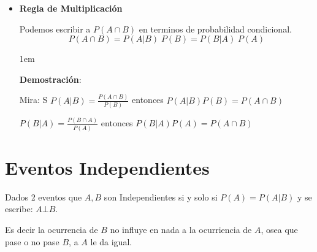 \documentclass[12pt, fleqn]{report}                             %
\newenvironment{SmallIndentation}[1][0.75em]                    %
        {\begin{adjustwidth}{#1}{}\begin{footnotesize}}             %
        {\end{footnotesize}\end{adjustwidth}}                       %
\theoremstyle{break}                                            %
\begin{document}
\begin{itemize}
\begin{SmallIndentation}[1em]
                        \end{SmallIndentation}

                    \item 
                        \textbf{Regla de Multiplicación}

                        Podemos escribir a $P(A \cap B)$ en terminos de probabilidad condicional.
                        \begin{equation*}
                            P(A \cap B)
                            = P(A | B) \; P(B)          
                            = P(B | A) \; P(A) 
                        \end{equation*}

                        \begin{SmallIndentation}[1em]
                            \textbf{Demostración}:
                            
                            Mira:
                            S
                            $P(A | B) = \frac{P(A \cap B)}{P(B)}$ entonces $P(A | B) P(B) = P(A \cap B)$ 

                            $P(B | A) = \frac{P(B \cap A)}{P(A)}$ entonces $P(B | A) P(A) = P(A \cap B)$ 

                        \end{SmallIndentation}
                            
                \end{itemize}

                    

        \clearpage
        \section{Eventos Independientes}

            Dados 2 eventos que $A, B$ son Independientes si y solo si
            $P(A) = P(A | B)$ y se escribe: $A \bot B$.

            Es decir la ocurrencia de $B$ no influye en nada a la ocurriencia de $A$, osea
            que pase o no pase $B$, a $A$ le da igual.


\end{document}

